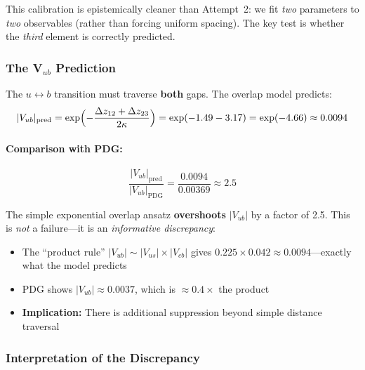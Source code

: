 This calibration is epistemically cleaner than Attempt~2: we fit \emph{two}
parameters to \emph{two} observables (rather than forcing uniform spacing).
The key test is whether the \emph{third} element is correctly predicted.

\subsubsection{The V\texorpdfstring{$_{ub}$}{ub} Prediction}

The $u \leftrightarrow b$ transition must traverse \textbf{both} gaps. The
overlap model predicts:
\begin{equation}
    |V_{ub}|_{\text{pred}} = \exp\Bigl(-\frac{\Delta z_{12} + \Delta z_{23}}{2\kappa}\Bigr)
    = \exp(-1.49 - 3.17) = \exp(-4.66) \approx 0.0094
    \label{eq:ch7_vub_pred}
\end{equation}

\paragraph{Comparison with PDG:}
\begin{equation}
    \frac{|V_{ub}|_{\text{pred}}}{|V_{ub}|_{\text{PDG}}}
    = \frac{0.0094}{0.00369} \approx 2.5
    \label{eq:ch7_vub_ratio}
\end{equation}

\begin{tcolorbox}[colback=orange!5, colframe=orange!50!black,
    title=\textbf{Attempt 2.1 Result: Factor 2.5 Discrepancy}]
The simple exponential overlap ansatz \textbf{overshoots} $|V_{ub}|$ by a factor of 2.5.
This is \emph{not} a failure---it is an \emph{informative discrepancy}:
\begin{itemize}[nosep]
    \item The ``product rule'' $|V_{ub}| \sim |V_{us}| \times |V_{cb}|$ gives
          $0.225 \times 0.042 \approx 0.0094$---exactly what the model predicts
    \item PDG shows $|V_{ub}| \approx 0.0037$, which is $\approx 0.4 \times$ the product
    \item \textbf{Implication:} There is additional suppression beyond simple
          distance traversal
\end{itemize}
\end{tcolorbox}

\subsubsection{Interpretation of the Discrepancy}

